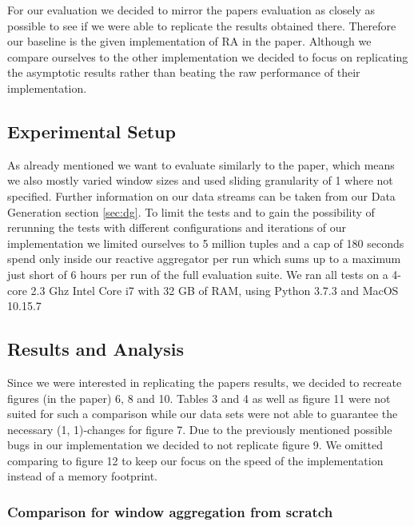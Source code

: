 For our evaluation we decided to mirror the papers evaluation as closely as possible
to see if we were able to replicate the results obtained there.
Therefore our baseline is the given implementation of RA in the paper.
Although we compare ourselves to the other implementation we decided to focus on
replicating the asymptotic results rather than beating the raw performance of their implementation.

\subsection{Experimental Setup}
As already mentioned we want to evaluate similarly to the paper, which means we also mostly varied
window sizes and used sliding granularity of 1 where not specified.
Further information on our data streams can be taken from our Data Generation section \ref{sec:dg}.
To limit the tests and to gain the possibility of rerunning the tests with different configurations
and iterations of our implementation we limited ourselves to 5 million tuples and
a cap of 180 seconds spend only inside our reactive aggregator per run
which sums up to a maximum just short of 6 hours per run of the full evaluation suite.
We ran all tests on a 4-core 2.3 Ghz Intel Core i7 with 32 GB of RAM, using
Python 3.7.3 and MacOS 10.15.7

\subsection{Results and Analysis}
Since we were interested in replicating the papers results, we decided to
recreate figures (in the paper) 6, 8 and 10. Tables 3 and 4 as well as figure 11 were not suited
for such a comparison while our data sets were not able to guarantee the necessary
(1, 1)-changes for figure 7. Due to the previously mentioned possible bugs in our
implementation we decided to not replicate figure 9. We omitted comparing to figure 12
to keep our focus on the speed of the implementation instead of a memory footprint.

\subsubsection{Comparison for window aggregation from scratch}



